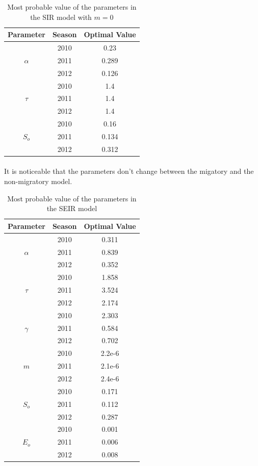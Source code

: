 \documentclass[11pt, a4paper]{article}
\begin{document}
\begin{table}[H]
\FloatBarrier
\centering
\begin{tabular}{| c | c | c |}
    \hline
    Parameter & Season & Optimal Value \\ \hline
    \multirow{3}{*}{$\alpha$} & 2010 & 0.23\\
    & 2011 & 0.289\\
    & 2012 & 0.126 \\ \hline
    \multirow{3}{*}{$\tau$} & 2010 & 1.4 \\ 
    & 2011 & 1.4\\
    & 2012 & 1.4\\ \hline
    \multirow{3}{*}{$S_o$} & 2010 & 0.16 \\ 
    & 2011 & 0.134 \\ 
    & 2012 & 0.312 \\ \hline
    \end{tabular}
    \caption{Most probable value of the parameters in the SIR model with $m=0$}
    \label{tab:sir0}
\end{table}

\paragraph{}
It is noticeable that the parameters don't change between the migatory and the non-migratory model.

\begin{table}[H]
\FloatBarrier
\centering
\begin{tabular}{| c | c | c |}
    \hline
    Parameter & Season & Optimal Value \\ \hline
    \multirow{3}{*}{$\alpha$} & 2010 & 0.311\\
    & 2011 & 0.839\\
    & 2012 & 0.352 \\ \hline
    \multirow{3}{*}{$\tau$} & 2010 & 1.858 \\ 
    & 2011 & 3.524\\
    & 2012 & 2.174\\ \hline
    \multirow{3}{*}{$\gamma$} & 2010 & 2.303 \\ 
    & 2011 & 0.584\\
    & 2012 & 0.702\\ \hline
    \multirow{3}{*}{$m$} & 2010 & 2.2e-6\\ 
    & 2011 & 2.1e-6 \\
    & 2012 & 2.4e-6 \\ \hline
    \multirow{3}{*}{$S_o$} & 2010 & 0.171 \\ 
    & 2011 & 0.112 \\ 
    & 2012 & 0.287 \\ \hline
    \multirow{3}{*}{$E_o$} & 2010 & 0.001 \\ 
    & 2011 & 0.006 \\ 
    & 2012 & 0.008 \\ \hline
    \end{tabular}
    \caption{Most probable value of the parameters in the SEIR model}
    \label{tab:seir}
\end{table}
\end{document}
